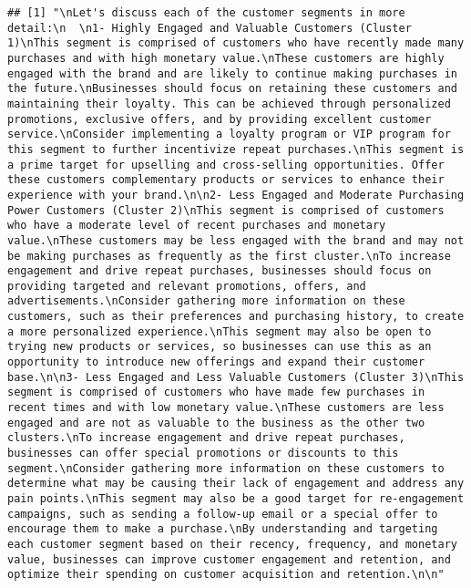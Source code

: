 \documentclass[
]{article}
\begin{document}
\begin{verbatim}
## [1] "\nLet's discuss each of the customer segments in more detail:\n  \n1- Highly Engaged and Valuable Customers (Cluster 1)\nThis segment is comprised of customers who have recently made many purchases and with high monetary value.\nThese customers are highly engaged with the brand and are likely to continue making purchases in the future.\nBusinesses should focus on retaining these customers and maintaining their loyalty. This can be achieved through personalized promotions, exclusive offers, and by providing excellent customer service.\nConsider implementing a loyalty program or VIP program for this segment to further incentivize repeat purchases.\nThis segment is a prime target for upselling and cross-selling opportunities. Offer these customers complementary products or services to enhance their experience with your brand.\n\n2- Less Engaged and Moderate Purchasing Power Customers (Cluster 2)\nThis segment is comprised of customers who have a moderate level of recent purchases and monetary value.\nThese customers may be less engaged with the brand and may not be making purchases as frequently as the first cluster.\nTo increase engagement and drive repeat purchases, businesses should focus on providing targeted and relevant promotions, offers, and advertisements.\nConsider gathering more information on these customers, such as their preferences and purchasing history, to create a more personalized experience.\nThis segment may also be open to trying new products or services, so businesses can use this as an opportunity to introduce new offerings and expand their customer base.\n\n3- Less Engaged and Less Valuable Customers (Cluster 3)\nThis segment is comprised of customers who have made few purchases in recent times and with low monetary value.\nThese customers are less engaged and are not as valuable to the business as the other two clusters.\nTo increase engagement and drive repeat purchases, businesses can offer special promotions or discounts to this segment.\nConsider gathering more information on these customers to determine what may be causing their lack of engagement and address any pain points.\nThis segment may also be a good target for re-engagement campaigns, such as sending a follow-up email or a special offer to encourage them to make a purchase.\nBy understanding and targeting each customer segment based on their recency, frequency, and monetary value, businesses can improve customer engagement and retention, and optimize their spending on customer acquisition and retention.\n\n"
\end{verbatim}
\end{document}
